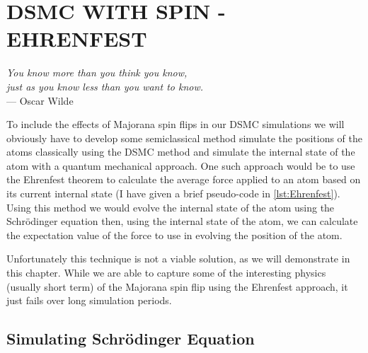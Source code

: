 
\chapter{DSMC WITH SPIN - EHRENFEST} %
\label{ch:dsmcehr} %


\begin{flushright}{\slshape    
You know more than you think you know, \\ 
just as you know less than you want to know.} \\ \medskip
--- Oscar Wilde
\end{flushright}

\bigskip


\label{ch:dsmcehr} %

To include the effects of Majorana spin flips in our DSMC simulations we will obviously have to develop some semiclassical method \ie simulate the positions of the atoms classically using the DSMC method and simulate the internal state of the atom with a quantum mechanical approach.
One such approach would be to use the Ehrenfest theorem \cite{Ehrenfest1927} to calculate the average force applied to an atom based on its current internal state (I have given a brief pseudo-code in \autoref{lst:Ehrenfest}).
Using this method we would evolve the internal state of the atom using the Schr\"odinger equation then, using the internal state of the atom, we can calculate the expectation value of the force to use in evolving the position of the atom.

Unfortunately this technique is not a viable solution, as we will demonstrate in this chapter.
While we are able to capture some of the interesting physics (usually short term) of the Majorana spin flip using the Ehrenfest approach, it just fails over long simulation periods.



\section{Simulating Schr\"odinger Equation}

